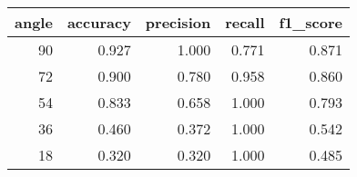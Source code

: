 \begin{tabular}{rrrrr}
\toprule
angle & accuracy & precision & recall & f1\_score \\
\midrule
90 & 0.927 & 1.000 & 0.771 & 0.871 \\
72 & 0.900 & 0.780 & 0.958 & 0.860 \\
54 & 0.833 & 0.658 & 1.000 & 0.793 \\
36 & 0.460 & 0.372 & 1.000 & 0.542 \\
18 & 0.320 & 0.320 & 1.000 & 0.485 \\
\bottomrule
\end{tabular}
